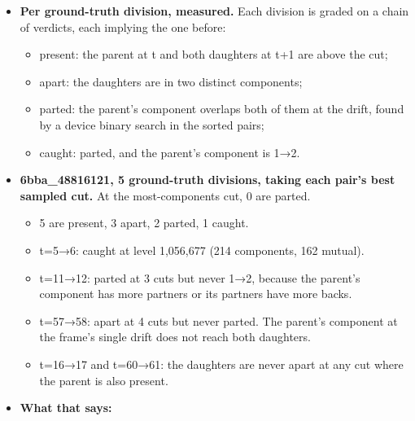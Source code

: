 \begin{itemize}
\begin{itemize}
\begin{itemize}
\item 6bba\_\allowbreak{}48816121: 6,688 moves, 570 1→2, 590 2→1, 42,853 disappear, 40,996 appear, out of 61,679 components. The ground truth holds 5 divisions over these pairs.
\item 44b6\_\allowbreak{}0113de3b: 7,962 moves, 819 1→2, 789 2→1, 22,545 disappear, 21,517 appear, out of 39,507. The ground truth holds 0 divisions.
\item So at the most-components cut, about 70\% of the components have no partner at the drift: specks that do not persist. Higher in the tree about 20\% do.
\item The ground truth annotates about 9 cells a frame. Census totals cannot be graded against it. Only a per-division verdict can.
\end{itemize}
\item \textbf{Per ground-truth division, measured.} Each division is graded on a chain of verdicts, each implying the one before:

\begin{itemize}
\item present: the parent at t and both daughters at t+1 are above the cut;
\item apart: the daughters are in two distinct components;
\item parted: the parent's component overlaps both of them at the drift, found by a device binary search in the sorted pairs;
\item caught: parted, and the parent's component is 1→2.
\end{itemize}
\item \textbf{6bba\_\allowbreak{}48816121, 5 ground-truth divisions, taking each pair's best sampled cut.} At the most-components cut, 0 are parted.

\begin{itemize}
\item 5 are present, 3 apart, 2 parted, 1 caught.
\item t=5→6: caught at level 1,056,677 (214 components, 162 mutual).
\item t=11→12: parted at 3 cuts but never 1→2, because the parent's component has more partners or its partners have more backs.
\item t=57→58: apart at 4 cuts but never parted. The parent's component at the frame's single drift does not reach both daughters.
\item t=16→17 and t=60→61: the daughters are never apart at any cut where the parent is also present.
\end{itemize}
\item \textbf{What that says:}


\end{itemize}
\end{itemize}
